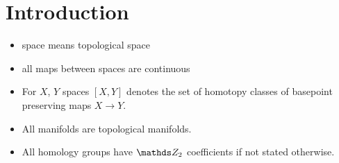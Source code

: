 % 

\chapter*{Introduction}

\begin{itemize}
\item space means topological space
\item all maps between spaces are continuous
\item For $X$, $Y$ spaces $[X,Y]$ denotes the set of homotopy classes
  of basepoint preserving maps $X\to Y$.
\item All manifolds are topological manifolds.
\item All homology groups have $\Zmod2$ coefficients if not stated otherwise.
\end{itemize}



